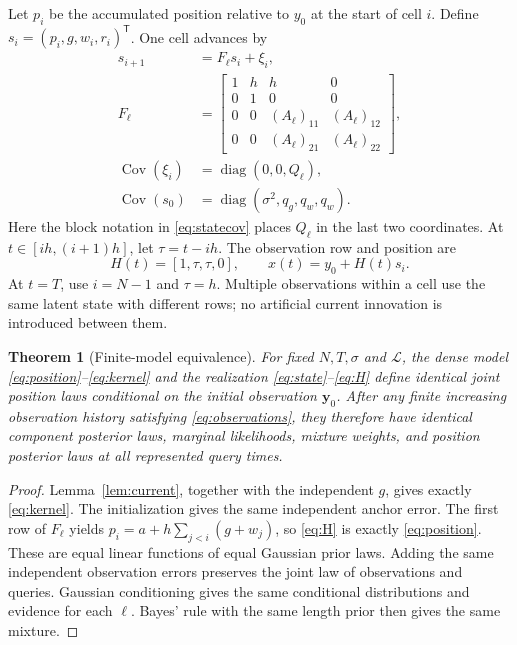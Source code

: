 \documentclass[journal]{IEEEtran}
\newtheorem{theorem}{Theorem}
\newcommand{\Cov}{\operatorname{Cov}}
\newcommand{\diag}{\operatorname{diag}}
\newcommand{\trans}{\mathsf{T}}
\begin{document}
Let $p_i$ be the accumulated position relative to $y_0$ at the start of
cell $i$. Define $s_i=(p_i,g,w_i,r_i)^\trans$. One cell advances by
\begin{align}
 s_{i+1}&=F_\ell s_i+\xi_i,\label{eq:state}\\
 F_\ell&=\begin{bmatrix}
 1&h&h&0\\0&1&0&0\\
 0&0&(A_\ell)_{11}&(A_\ell)_{12}\\
 0&0&(A_\ell)_{21}&(A_\ell)_{22}
 \end{bmatrix},\nonumber\\
 \Cov(\xi_i)&=\diag(0,0,Q_\ell),\nonumber\\
 \Cov(s_0)&=\diag(\sigma^2,q_g,q_w,q_w).
 \label{eq:statecov}
\end{align}
Here the block notation in \eqref{eq:statecov} places $Q_\ell$ in the
last two coordinates. At $t\in[ih,(i+1)h]$, let $\tau=t-ih$. The observation
row and position are
\begin{equation}
 H(t)=[1,\tau,\tau,0],\qquad x(t)=y_0+H(t)s_i.
 \label{eq:H}
\end{equation}
At $t=T$, use $i=N-1$ and $\tau=h$. Multiple observations within a cell
use the same latent state with different rows; no artificial current
innovation is introduced between them.

\begin{theorem}[Finite-model equivalence]
\label{thm:equivalence}
For fixed $N,T,\sigma$ and $\mathcal L$, the dense model
\eqref{eq:position}--\eqref{eq:kernel} and the realization
\eqref{eq:state}--\eqref{eq:H} define identical joint position laws conditional on the initial
observation $\bm y_0$.
After any finite increasing observation history satisfying
\eqref{eq:observations}, they therefore have identical component
posterior laws, marginal likelihoods, mixture weights, and position
posterior laws at all represented query times.
\end{theorem}
\begin{proof}
Lemma~\ref{lem:current}, together with the independent $g$, gives exactly
\eqref{eq:kernel}. The initialization gives the same independent anchor
error. The first row of $F_\ell$ yields
$p_i=a+h\sum_{j<i}(g+w_j)$, so \eqref{eq:H} is exactly
\eqref{eq:position}. These are equal linear functions of equal Gaussian
prior laws. Adding the same independent observation errors preserves
the joint law of observations and queries. Gaussian conditioning gives
the same conditional distributions and evidence for each $\ell$.
Bayes' rule with the same length prior then gives the same mixture.
\end{proof}
\end{document}
